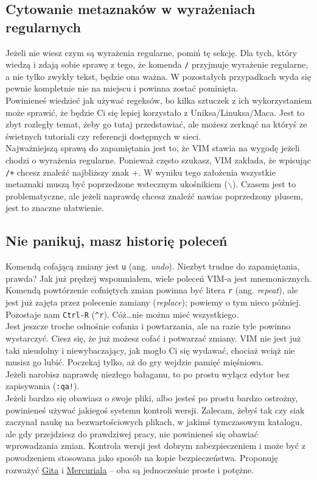 \documentclass[a4paper,12pt]{article}
\begin{document}
\subsection{Cytowanie metaznaków w wyrażeniach regularnych}
Jeżeli nie wiesz czym są wyrażenia regularne, pomiń tę sekcję. Dla tych, który wiedzą i zdają sobie sprawę z tego, że komenda {\tt /} przyjmuje wyrażenie regularne, a nie tylko zwykły tekst, będzie ona ważna. W pozostałych przypadkach wyda się pewnie kompletnie nie na miejscu i powinna zostać pominięta.\\
Powinieneś wiedzieć jak używać regeksów, bo kilka sztuczek z ich wykorzystaniem może sprawić, że będzie Ci się lepiej korzystało z Uniksa/Linuksa/Maca. Jest to zbyt rozległy temat, żeby go tutaj przedstawiać, ale możesz zerknąć na któryś ze świetnych tutoriali czy referencji dostępnych w sieci.\\
Najważniejszą sprawą do zapamiętania jest to, że VIM stawia na wygodę jeżeli chodzi o wyrażenia regularne. Ponieważ często szukasz, VIM zakłada, że wpisując {\tt /+} chcesz znaleźć najbliższy znak +. W wyniku tego założenia wszystkie metaznaki muszą być poprzedzone wstecznym ukośnikiem ({\tt $\backslash$}). Czasem jest to problematyczne, ale jeżeli naprawdę chcesz znaleźć nawias poprzedzony plusem, jest to znaczne ułatwienie.
\subsection{Nie panikuj, masz historię poleceń}
Komendą cofającą zmiany jest {\tt u} (ang. {\it undo}). Niezbyt trudne do zapamiętania, prawda? Jak już prędzej wspomniałem, wiele poleceń VIM-a jest mnemonicznych.\\
Komendą powtórzenie cofniętych zmian powinna być litera {\tt r} (ang. {\it repeat}), ale jest już zajęta przez polecenie zamiany ({\it replace}); powiemy o tym nieco później. Pozostaje nam {\tt Ctrl-R} ({\tt \^{}r}). Cóż\ldots nie można mieć wszystkiego.\\
Jest jeszcze troche odnośnie cofania i powtarzania, ale na razie tyle powinno wystarczyć. Ciesz się, że już możesz cofać i potwarzać zmiany. VIM nie jest już taki nieudolny i niewybaczający, jak mogło Ci się wydawać, chociaż wciąż nie musisz go lubić. Poczekaj tylko, aż do gry wejdzie pamięć mięśniowa.\\
Jeżeli narobisz naprawdę niezłego bałaganu, to po prostu wyłącz edytor bez zapisywania ({\tt :qa!}).\\
Jeżeli bardzo się obawiasz o swoje pliki, albo jesteś po prostu bardzo ostrożny, powinieneś używać jakiegoś systemu kontroli wersji. Zalecam, żebyś tak czy siak zaczynał naukę na bezwartościowych plikach, w jakimś tymczasowym katalogu, ale gdy przejdziesz do prawdziwej pracy, nie powinieneś się obawiać wprowadzania zmian. Kontrola wersji jest dobrym zabezpieczeniem i może być z powodzeniem stosowana jako sposób na kopie bezpieczeństwa. Proponuję rozważyć \href{http://git-scm.com/}{Gita} i \href{http://mercurial.selenic.com/}{Mercuriala} -- oba są jednocześnie proste i potężne.
\end{document}

